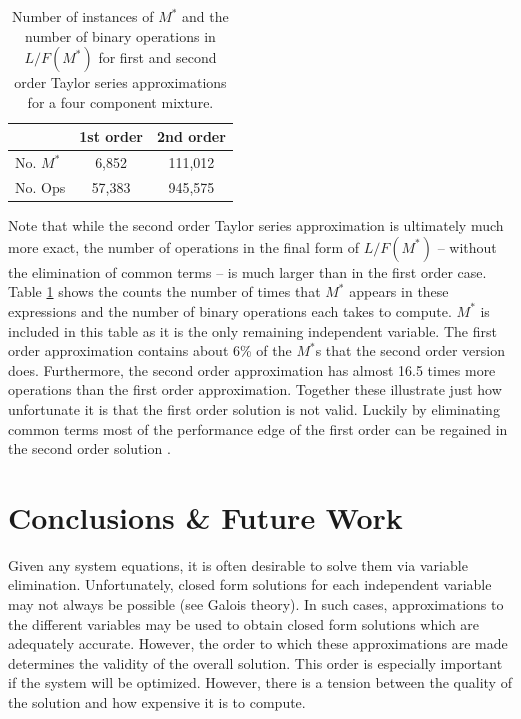 \documentclass{ansconf}
\begin{document}
\begin{table}[htbp]
\begin{center}
\caption{Number of instances of $M^*$ and the number of binary operations in 
         $L/F(M^*)$ for first and second order Taylor series approximations for a 
         four component mixture.}
\begin{tabular}{|l||c|c|}
\hline
& \bf{1st order} & \bf{2nd order} \\
\hline
No. $M^*$ & 6,852  &  111,012 \\ 
\hline
No. Ops   & 57,383 &  945,575 \\ 
\hline
\end{tabular}
\label{count_ops}
\end{center}
\end{table}


Note that while the second order Taylor series approximation is ultimately much more 
exact, the number of operations in the final form of $L/F(M^*)$ -- without the 
elimination of common terms -- is much larger than 
in the first order case.  Table \ref{count_ops} shows the counts the number of times
that $M^*$ appears in these expressions and the number of binary operations each 
takes to compute.  $M^*$ is included in this table as it is the only remaining 
independent variable.  The first order approximation contains about 6\% of the
$M^*$s that the second order version does.  Furthermore, the second order 
approximation has almost 16.5 times more operations than the first order 
approximation.  Together these illustrate just how unfortunate it is that the first
order solution is not valid.  Luckily by eliminating common terms most of the 
performance edge of the first order can be regained in the second order solution
\cite{Scopatz2012}.

\section{Conclusions \& Future Work}
\label{sec:conc}

Given any system equations, it is often desirable to solve them via variable 
elimination.  Unfortunately, closed form solutions for each independent variable
may not always be possible (see Galois theory).  In such cases, approximations to 
the different variables may be used to obtain closed form solutions which are
adequately accurate.  However, the order to which these approximations are made
determines the validity of the overall solution.  This order is especially 
important if the system will be optimized.  However, there is a tension between 
the quality of the solution and how expensive it is to compute.
\end{document}
